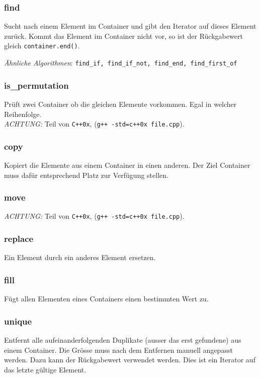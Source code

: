 \begin{frame}[fragile]
\frametitle{find}
{\tiny
Sucht nach einem Element im Container und gibt den Iterator auf dieses Element zurück.
Kommt das Element im Container nicht vor, so ist der Rückgabewert gleich \verb|container.end()|.



\emph{Ähnliche Algorithmen}: \verb|find_if, find_if_not, find_end, find_first_of|
}
\end{frame}

\begin{frame}[fragile]
\frametitle{is\_permutation}
{\tiny
Prüft zwei Container ob die gleichen Elemente vorkommen. Egal in welcher Reihenfolge.\\
\emph{ACHTUNG:} Teil von \verb|C++0x|, (\verb|g++ -std=c++0x file.cpp|).


}
\end{frame}

\begin{frame}[fragile]
\frametitle{copy}
{\tiny
Kopiert die Elemente aus einem Container in einen anderen. Der Ziel Container muss
dafür entsprechend Platz zur Verfügung stellen.


}
\end{frame}

\begin{frame}[fragile]
\frametitle{move}
{\tiny
\emph{ACHTUNG:} Teil von \verb|C++0x|, (\verb|g++ -std=c++0x file.cpp|).


}
\end{frame}

\begin{frame}[fragile]
\frametitle{replace}
{\tiny
Ein Element durch ein anderes Element ersetzen.


}
\end{frame}

\begin{frame}[fragile]
\frametitle{fill}
{\tiny
Fügt allen Elementen eines Containers einen bestimmten Wert zu.


}
\end{frame}

\begin{frame}[fragile]
\frametitle{unique}
{\tiny
Entfernt alle aufeinanderfolgenden Duplikate (ausser das erst gefundene) aus einem Container.
Die Grösse muss nach dem Entfernen manuell angepasst werden. Dazu kann der Rückgabewert
verwendet werden. Dies ist ein Iterator auf das letzte gültige Element.


}
\end{frame}

